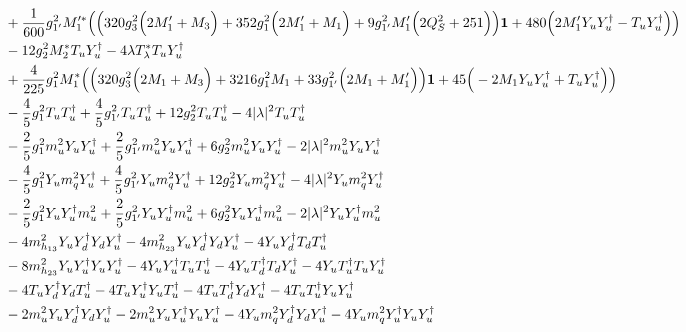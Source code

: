 {\begin{align}
 &+\frac{1}{600} g_{1'}^{2} M_1'^* \Big(\Big(320 g_{3}^{2} \Big(2 M_1'  + M_3\Big) + 352 g_{1}^{2} \Big(2 M_1'  + M_1\Big) + 9 g_{1'}^{2} M_1' \Big(2 Q_{S}^{2}  + 251\Big)\Big){\bf 1}  + 480 \Big(2 M_1' {Y_u  Y_{u}^{\dagger}}  - {T_u  Y_{u}^{\dagger}} \Big)\Big)\nonumber \\ 
 &-12 g_{2}^{2} M_2^* {T_u  Y_{u}^{\dagger}} -4 \lambda T_{\lambda}^* {T_u  Y_{u}^{\dagger}} \nonumber \\ 
 &+\frac{4}{225} g_{1}^{2} M_1^* \Big(\Big(320 g_{3}^{2} \Big(2 M_1  + M_3\Big) + 3216 g_{1}^{2} M_1  + 33 g_{1'}^{2} \Big(2 M_1  + M_1'\Big)\Big){\bf 1}  + 45 \Big(-2 M_1 {Y_u  Y_{u}^{\dagger}}  + {T_u  Y_{u}^{\dagger}}\Big)\Big)\nonumber \\ 
 &-\frac{4}{5} g_{1}^{2} {T_u  T_{u}^{\dagger}} +\frac{4}{5} g_{1'}^{2} {T_u  T_{u}^{\dagger}} +12 g_{2}^{2} {T_u  T_{u}^{\dagger}} -4 |\lambda|^2 {T_u  T_{u}^{\dagger}} \nonumber \\ 
 &-\frac{2}{5} g_{1}^{2} {m_u^2  Y_u  Y_{u}^{\dagger}} +\frac{2}{5} g_{1'}^{2} {m_u^2  Y_u  Y_{u}^{\dagger}} +6 g_{2}^{2} {m_u^2  Y_u  Y_{u}^{\dagger}} -2 |\lambda|^2 {m_u^2  Y_u  Y_{u}^{\dagger}} \nonumber \\ 
 &-\frac{4}{5} g_{1}^{2} {Y_u  m_q^2  Y_{u}^{\dagger}} +\frac{4}{5} g_{1'}^{2} {Y_u  m_q^2  Y_{u}^{\dagger}} +12 g_{2}^{2} {Y_u  m_q^2  Y_{u}^{\dagger}} -4 |\lambda|^2 {Y_u  m_q^2  Y_{u}^{\dagger}} \nonumber \\ 
 &-\frac{2}{5} g_{1}^{2} {Y_u  Y_{u}^{\dagger}  m_u^2} +\frac{2}{5} g_{1'}^{2} {Y_u  Y_{u}^{\dagger}  m_u^2} +6 g_{2}^{2} {Y_u  Y_{u}^{\dagger}  m_u^2} -2 |\lambda|^2 {Y_u  Y_{u}^{\dagger}  m_u^2} \nonumber \\ 
 &-4 m_{h_{13}}^2 {Y_u  Y_{d}^{\dagger}  Y_d  Y_{u}^{\dagger}} -4 m_{h_{23}}^2 {Y_u  Y_{d}^{\dagger}  Y_d  Y_{u}^{\dagger}} -4 {Y_u  Y_{d}^{\dagger}  T_d  T_{u}^{\dagger}} \nonumber \\ 
 &-8 m_{h_{23}}^2 {Y_u  Y_{u}^{\dagger}  Y_u  Y_{u}^{\dagger}} -4 {Y_u  Y_{u}^{\dagger}  T_u  T_{u}^{\dagger}} -4 {Y_u  T_{d}^{\dagger}  T_d  Y_{u}^{\dagger}} -4 {Y_u  T_{u}^{\dagger}  T_u  Y_{u}^{\dagger}} \nonumber \\ 
 &-4 {T_u  Y_{d}^{\dagger}  Y_d  T_{u}^{\dagger}} -4 {T_u  Y_{u}^{\dagger}  Y_u  T_{u}^{\dagger}} -4 {T_u  T_{d}^{\dagger}  Y_d  Y_{u}^{\dagger}} -4 {T_u  T_{u}^{\dagger}  Y_u  Y_{u}^{\dagger}} \nonumber \\ 
 &-2 {m_u^2  Y_u  Y_{d}^{\dagger}  Y_d  Y_{u}^{\dagger}} -2 {m_u^2  Y_u  Y_{u}^{\dagger}  Y_u  Y_{u}^{\dagger}} -4 {Y_u  m_q^2  Y_{d}^{\dagger}  Y_d  Y_{u}^{\dagger}} -4 {Y_u  m_q^2  Y_{u}^{\dagger}  Y_u  Y_{u}^{\dagger}} \nonumber \\ 

\end{align}}
